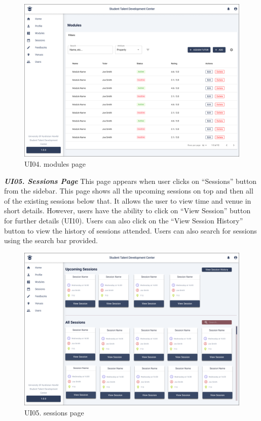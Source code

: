 \begin{justify}
    \begin{figure}[H]
    \centerline{\includegraphics[width=150mm,scale=1]{figures/analysis_and_design/design/UI/4. Modules Page (UI04).png}}
    \caption{UI04. modules page}
    \label{UI04}
    \end{figure}
    \clearpage



    \noindent\textbf{\textit{UI05. Sessions Page}}\newendline
    This page appears when user clicks on “Sessions” button from the sidebar. This page shows all the upcoming sessions on top and then all of the existing sessions below that. It allows the user to view time and venue in short details. However, users have the ability to click on “View Session” button for further details (UI10).  Users can also click on the “View Session History” button to view the history of sessions attended. Users can also search for sessions using the search bar provided.\\

    \begin{figure}[H]
    \centerline{\includegraphics[width=150mm,scale=1]{figures/analysis_and_design/design/UI/5. Sessions Page (UI05).png}}
    \caption{UI05. sessions page}
    \label{UI05}
    \end{figure}
    \clearpage





\end{justify}
